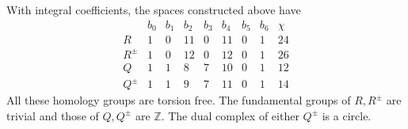 \begin{proposition}\hypertarget{tag-02ZR}{}\label{push:src:A.4.1}\label{push:A41}

With integral coefficients, the spaces constructed above have
\[
\begin{array}{c|rrrrrrr|r}
&b_0&b_1&b_2&b_3&b_4&b_5&b_6&\chi\\\hline
R&1&0&11&0&11&0&1&24\\
R^\pm&1&0&12&0&12&0&1&26\\
Q&1&1&8&7&10&0&1&12\\
Q^\pm&1&1&9&7&11&0&1&14
\end{array}
\]
All these homology groups are torsion free. The fundamental
groups of $R,R^\pm$ are trivial and those of $Q,Q^\pm$ are
$\mathbb Z$. The dual complex of either $Q^\pm$ is a circle.
\end{proposition}


